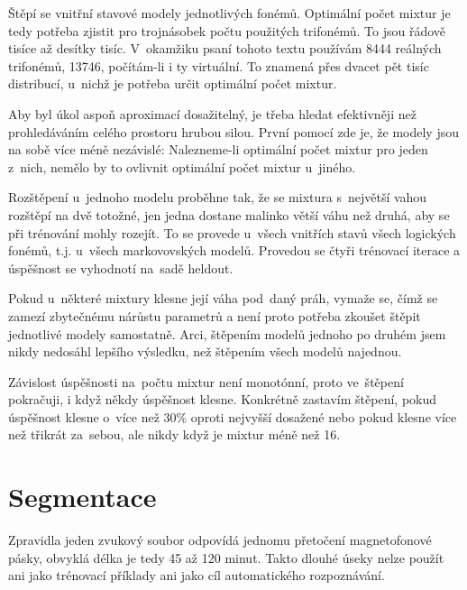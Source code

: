 \begin{enumerate}
Štěpí se vnitřní stavové modely jednotlivých fonémů. Optimální počet
mixtur je tedy potřeba zjistit pro trojnásobek počtu použitých trifonémů. To
jsou řádově tisíce až desítky tisíc. V~okamžiku psaní tohoto textu používám 8444
reálných trifonémů, 13746, počítám-li i ty virtuální. To znamená přes dvacet pět
tisíc distribucí, u~nichž je potřeba určit optimální počet mixtur.

Aby byl úkol aspoň aproximací dosažitelný, je třeba hledat efektivněji než
prohledáváním celého prostoru hrubou silou. První pomocí zde je, že modely jsou
na sobě více méně nezávislé: Nalezneme-li optimální počet mixtur pro jeden
z~nich, nemělo by to ovlivnit optimální počet mixtur u~jiného.

Rozštěpení u~jednoho modelu proběhne tak, že se mixtura s~největší vahou
rozštěpí na dvě totožné, jen jedna dostane malinko větší váhu než druhá, aby se
při trénování mohly rozejít. To se provede u~všech vnitřích stavů všech
logických fonémů, t.j. u~všech markovovských modelů. Provedou se čtyři trénovací
iterace a úspěšnost se vyhodnotí na~sadě heldout.

Pokud u~některé mixtury klesne její váha pod~daný práh, vymaže se, čímž se
zamezí zbytečnému nárůstu parametrů a není proto potřeba zkoušet štěpit
jednotlivé modely samostatně. Arci, štěpením modelů jednoho po druhém jsem nikdy nedosáhl lepšího
výsledku, než štěpením všech modelů najednou.

Závislost úspěšnosti na~počtu mixtur není monotónní, proto ve~štěpení pokračuji,
i když někdy úspěšnost klesne. Konkrétně zastavím štěpení, pokud úspěšnost
klesne o~více než 30\% oproti nejvyšší dosažené nebo pokud klesne více než
třikrát za~sebou, ale nikdy když je mixtur méně než 16.


\end{enumerate}

\section{Segmentace}

Zpravidla jeden zvukový soubor odpovídá jednomu přetočení magnetofonové pásky,
obvyklá délka je tedy 45 až 120 minut. Takto dlouhé úseky nelze použít ani jako
trénovací příklady ani jako cíl automatického rozpoznávání.

